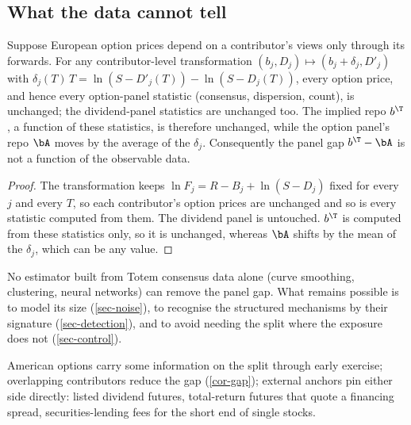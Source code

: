 \subsection{What the data cannot tell}
\begin{theorem}\label{thm-nonid}
Suppose European option prices depend on a contributor's views only through its forwards. For any contributor-level
transformation $(b_j,D_j)\mapsto(b_j+\delta_j,D'_j)$ with $\delta_j(T)\,T=\ln(S-D'_j(T))-\ln(S-D_j(T))$, every option
price, and hence every option-panel statistic (consensus, dispersion, count), is unchanged; the dividend-panel
statistics are unchanged too. The implied repo $b^\T$, a function of these statistics, is therefore unchanged, while
the option panel's repo $\bA$ moves by the average of the $\delta_j$. Consequently the panel gap $b^\T-\bA$ is not a
function of the observable data.
\end{theorem}
\begin{proof}
The transformation keeps $\ln F_j=R-B_j+\ln(S-D_j)$ fixed for every $j$ and every $T$, so each contributor's option
prices are unchanged and so is every statistic computed from them. The dividend panel is untouched. $b^\T$ is computed
from these statistics only, so it is unchanged, whereas $\bA$ shifts by the mean of the $\delta_j$, which can be any
value.
\end{proof}

\begin{corollary}
No estimator built from Totem consensus data alone (curve smoothing, clustering, neural networks) can remove the
panel gap. What remains possible is to model its size (\cref{sec-noise}), to recognise the structured mechanisms
by their signature (\cref{sec-detection}), and to avoid needing the split where the exposure does not
(\cref{sec-control}).
\end{corollary}

\begin{remark}
American options carry some information on the split through early exercise; overlapping contributors reduce the gap
(\cref{cor-gap}); external anchors pin either side directly: listed dividend futures, total-return futures that
quote a financing spread, securities-lending fees for the short end of single stocks.
\end{remark}

